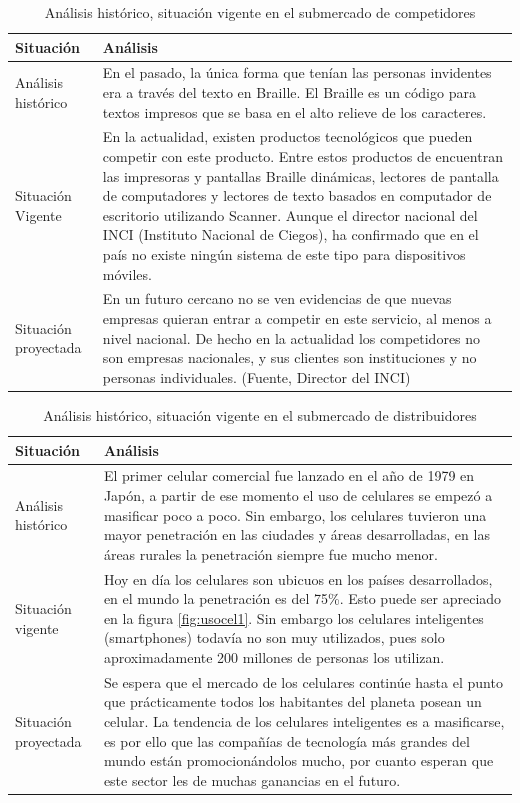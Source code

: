 \documentclass[a4paper, 12pt, oneside]{article}
\begin{document}
	\begin{table}
		\caption{Análisis histórico, situación vigente en el submercado de competidores}
		\begin{tabular}{ | p{4cm} | p{10cm} | }
		\hline
		Situación & Análisis \\
		\hline					
		Análisis histórico & 
		En el pasado, la única forma que tenían las personas invidentes era a través del texto en Braille. El Braille es un código para textos impresos que se basa en el alto relieve de los caracteres. \\
		\hline
		Situación Vigente &
		En la actualidad, existen productos tecnológicos que pueden competir con este producto. Entre estos productos de encuentran las impresoras y pantallas Braille dinámicas, lectores de pantalla de computadores y lectores de texto basados en computador de escritorio utilizando Scanner. Aunque el director nacional del INCI (Instituto Nacional de Ciegos), ha confirmado que en el país no existe ningún sistema de este tipo para dispositivos móviles. \\
		\hline
		Situación proyectada &
		En un futuro cercano no se ven evidencias de que nuevas empresas quieran entrar a competir en este servicio, al menos a nivel nacional. De hecho en la actualidad los competidores no son empresas nacionales, y sus clientes son instituciones y no personas individuales. (Fuente, Director del INCI)\\
		\hline
		\end{tabular}
		\label{compHistorico}
	\end{table}
	
	\begin{table}
		\caption{Análisis histórico, situación vigente en el submercado de distribuidores}
		\begin{tabular}{ | p{4cm} | p{10cm} | }
		\hline
		Situación & Análisis \\
		\hline					
		Análisis histórico & 
		El primer celular comercial fue lanzado en el año de 1979 en Japón, a partir de ese momento el uso de celulares se empezó a masificar poco a poco. Sin embargo, los celulares tuvieron una mayor penetración en las ciudades y áreas desarrolladas, en las áreas rurales la penetración siempre fue mucho menor.
		\\
		\hline
		Situación vigente &
		Hoy en día los celulares son ubicuos en los países desarrollados, en el mundo la penetración es del 75\%. Esto puede ser apreciado en la figura \ref{fig:usocel1}.
		Sin embargo los celulares inteligentes (smartphones) todavía no son muy utilizados, pues solo aproximadamente 200 millones de personas los utilizan.
		 \\
		\hline
		Situación proyectada &
		Se espera que el mercado de los celulares continúe hasta el punto que prácticamente todos los habitantes del planeta posean un celular. La tendencia de los celulares inteligentes es a masificarse, es por ello que las compañías de tecnología más grandes del mundo están promocionándolos mucho, por cuanto esperan que este sector les de muchas ganancias en el futuro.
		 \\
		\hline
		\end{tabular}
		\label{distHistorico}
	\end{table}
\end{document}
